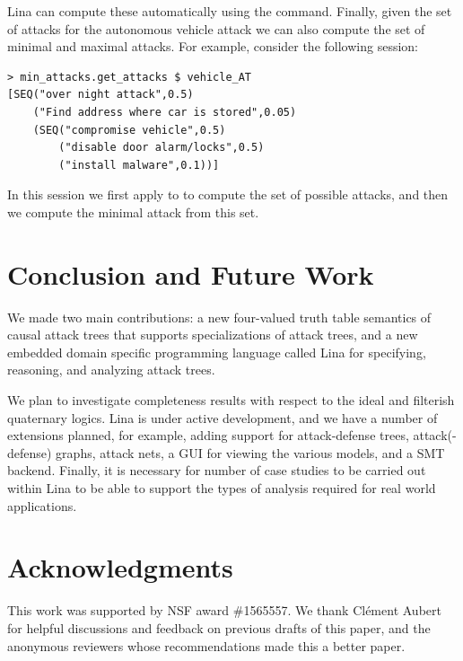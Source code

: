 \documentclass{llncs}
\begin{document}
Lina can compute these automatically using the 
command.  Finally, given the set of attacks for the autonomous vehicle
attack we can also compute the set of minimal and maximal attacks.
For example, consider the following session:
\begin{mdframed}
  \scriptsize
  \begin{verbatim}
> min_attacks.get_attacks $ vehicle_AT
[SEQ("over night attack",0.5)
	("Find address where car is stored",0.05)
	(SEQ("compromise vehicle",0.5)
		("disable door alarm/locks",0.5)
		("install malware",0.1))]
  \end{verbatim}
\end{mdframed}

In this session we first apply  to  to
compute the set of possible attacks, and then we compute the minimal
attack from this set.



\vspace{-7px}
\section{Conclusion and Future Work}
\label{sec:conclusion}
We made two main contributions: a new four-valued truth table
semantics of causal attack trees that supports specializations of
attack trees, and a new embedded domain specific programming language
called Lina for specifying, reasoning, and analyzing attack trees.

We plan to investigate completeness results with respect to the ideal
and filterish quaternary logics. Lina is under active development, and
we have a number of extensions planned, for example, adding support
for attack-defense trees, attack(-defense) graphs, attack nets, a GUI
for viewing the various models, and a SMT backend.  Finally, it is
necessary for number of case studies to be carried out within Lina to
be able to support the types of analysis required for real world
applications.

\vspace{-7px}
\section{Acknowledgments}
\label{sec:acknowledgments}
This work was supported by NSF award \#1565557.  We thank Cl\'ement
Aubert for helpful discussions and feedback on previous drafts of this
paper, and the anonymous reviewers whose recommendations made this a
better paper.
\end{document}
